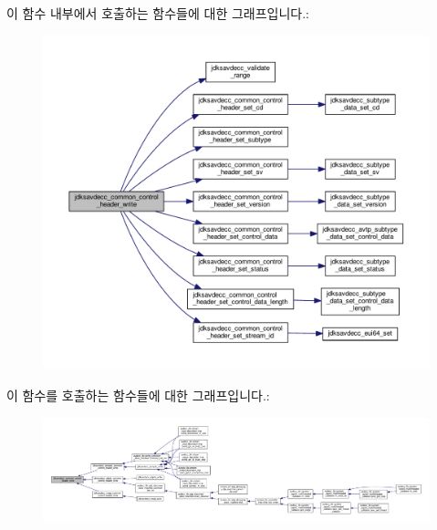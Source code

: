 이 함수 내부에서 호출하는 함수들에 대한 그래프입니다.\+:
\nopagebreak
\begin{figure}[H]
\begin{center}
\leavevmode
\includegraphics[width=350pt]{group__jdksavdecc__avtp__common__control__header_ga5ee847b232024b2cf936899b912f0c96_cgraph}
\end{center}
\end{figure}




이 함수를 호출하는 함수들에 대한 그래프입니다.\+:
\nopagebreak
\begin{figure}[H]
\begin{center}
\leavevmode
\includegraphics[width=350pt]{group__jdksavdecc__avtp__common__control__header_ga5ee847b232024b2cf936899b912f0c96_icgraph}
\end{center}
\end{figure}


